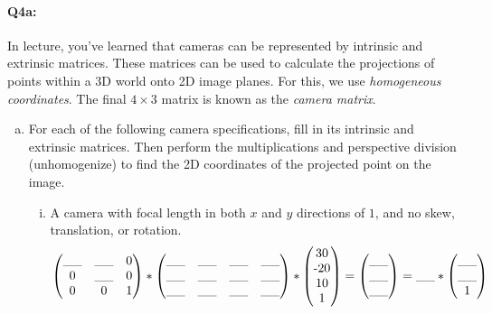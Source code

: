 \paragraph{Q4a:} In lecture, you've learned that cameras can be represented by intrinsic and extrinsic matrices. These matrices can be used to calculate the projections of points within a 3D world onto 2D image planes. For this, we use \emph{homogeneous coordinates}. The final $4\times3$ matrix is known as the \emph{camera matrix}.
\begin{enumerate} [(a)]
\item For each of the following camera specifications, fill in its intrinsic and extrinsic matrices. Then perform the multiplications and perspective division (unhomogenize) to find the 2D coordinates of the projected point on the image.
\begin{enumerate} [(i)]

\item A camera with focal length in both $x$ and $y$ directions of $1$, and no skew, translation, or rotation.
\vspace{-0.3cm}
\begin{align*}
    \begin{pmatrix} 
    \_\_ & \_\_ & $0$ \\ 
    $0$ & \_\_ & $0$ \\ 
    $0$ & $0$ & $1$ \end{pmatrix} *
    \begin{pmatrix} 
    \_\_ & \_\_ & \_\_ & \_\_ \\ 
    \_\_ & \_\_ & \_\_ & \_\_ \\ 
    \_\_ & \_\_ & \_\_ & \_\_ \end{pmatrix} * 
    \begin{pmatrix} 
    $30$ \\ 
    $-20$ \\ 
    $10$ \\ 
    $1$ \end{pmatrix}
    = \begin{pmatrix}  \_\_ \\ \_\_ \\ \_\_ \end{pmatrix}
    = \_\_ * \begin{pmatrix}  \_\_ \\ \_\_ \\ $1$ \end{pmatrix}
\end{align*}


\end{enumerate}
\end{enumerate}
